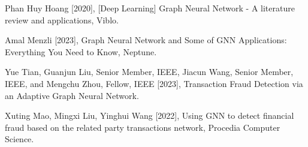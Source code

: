 \begin{thebibliography}{5}

\bibitem{}
Phan Huy Hoang [2020], [Deep Learning] Graph Neural Network - A literature review and applications, Viblo.

\bibitem{}
Amal Menzli [2023], Graph Neural Network and Some of GNN Applications: Everything You Need to Know, Neptune.

\bibitem{}
Yue Tian, Guanjun Liu, Senior Member, IEEE, Jiacun Wang, Senior Member, IEEE, and Mengchu Zhou, Fellow, IEEE [2023], Transaction Fraud Detection via an Adaptive Graph Neural Network.

\bibitem{}
Xuting Mao, Mingxi Liu, Yinghui Wang [2022], Using GNN to detect financial fraud based on the related party transactions network, Procedia Computer Science.

\end{thebibliography}